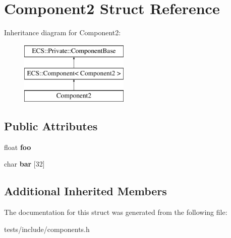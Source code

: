 \hypertarget{struct_component2}{\section{Component2 Struct Reference}
\label{struct_component2}
}
Inheritance diagram for Component2\-:\begin{figure}[H]
\begin{center}
\leavevmode
\includegraphics[height=3.000000cm]{struct_component2}
\end{center}
\end{figure}
\subsection*{Public Attributes}
\begin{DoxyCompactItemize}
\item 
\hypertarget{struct_component2_ababce67a405d155343e9f02facb764c0}{float {\bfseries foo}}\label{struct_component2_ababce67a405d155343e9f02facb764c0}

\item 
\hypertarget{struct_component2_a3f1e0b27014b818e02009076574b38bc}{char {\bfseries bar} \mbox{[}32\mbox{]}}\label{struct_component2_a3f1e0b27014b818e02009076574b38bc}

\end{DoxyCompactItemize}
\subsection*{Additional Inherited Members}


The documentation for this struct was generated from the following file\-:\begin{DoxyCompactItemize}
\item 
tests/include/components.\-h\end{DoxyCompactItemize}
